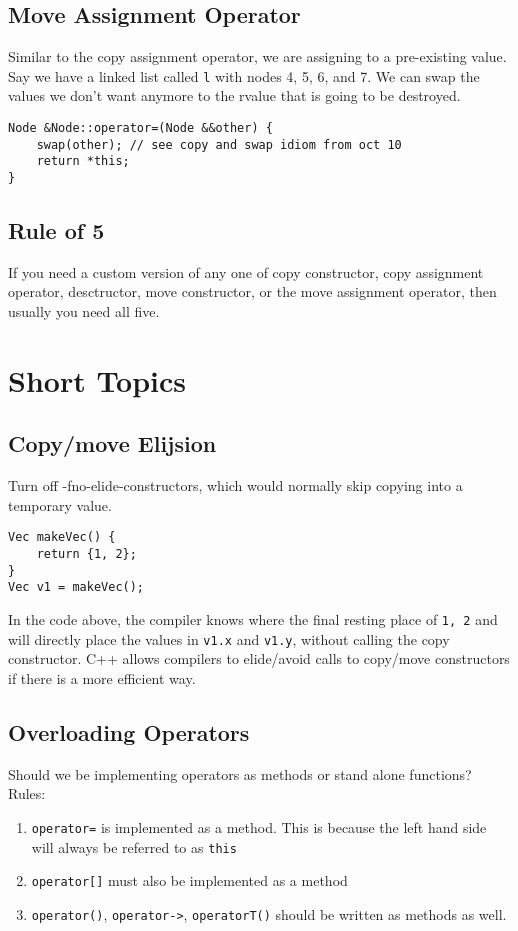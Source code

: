 \documentclass[12pt]{article}
\begin{document}
\subsection{Move Assignment Operator}

Similar to the copy assignment operator, we are assigning to a pre-existing value. Say we have a linked list called \lstinline{l} with nodes 4, 5, 6, and 7. We can swap the values we don't want anymore to the rvalue that is going to be destroyed.
\begin{lstlisting}
Node &Node::operator=(Node &&other) {
    swap(other); // see copy and swap idiom from oct 10
    return *this;
}
\end{lstlisting}

\subsection{Rule of 5}
If you need a custom version of any one of copy constructor, copy assignment operator, desctructor, move constructor, or the move assignment operator, then usually you need all five.

\section{Short Topics}

\subsection{Copy/move Elijsion} 
Turn off -fno-elide-constructors, which would normally skip copying into a temporary value.
\begin{lstlisting}
Vec makeVec() {
    return {1, 2};
}
Vec v1 = makeVec();
\end{lstlisting}
In the code above, the compiler knows where the final resting place of \lstinline{1, 2} and will directly place the values in \lstinline{v1.x} and \lstinline{v1.y}, without calling the copy constructor. C++ allows compilers to elide/avoid calls to copy/move constructors if there is a more efficient way.

\subsection{Overloading Operators}
Should we be implementing operators as methods or stand alone functions?
\\Rules:
\begin{enumerate}
    \item \lstinline{operator=} is implemented as a method. This is because the left hand side will always be referred to as \lstinline{this}
    \item \lstinline{operator[]} must also be implemented as a method
    \item \lstinline{operator()}, \lstinline{operator->}, \lstinline{operatorT()} should be written as methods as well.
\end{enumerate}
\end{document}
